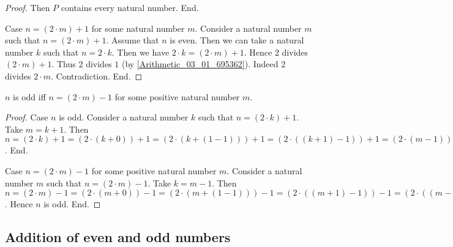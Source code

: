 \documentclass[../../arithmetic.tex]{subfiles}
\begin{document}
\begin{forthel}
\begin{proof}
        Then $P$ contains every natural number.
      End.

      Case $n = (2 \cdot m) + 1$ for some natural number $m$.
        Consider a natural number $m$ such that $n = (2 \cdot m) + 1$.
        Assume that $n$ is even.
        Then we can take a natural number $k$ such that $n = 2 \cdot k$.
        Then we have $2 \cdot k = (2 \cdot m) + 1$.
        Hence $2$ divides $(2 \cdot m) + 1$.
        Thus $2$ divides $1$ (by \ref{Arithmetic_03_01_695362}).
        Indeed $2$ divides $2 \cdot m$.
        Contradiction.
      End.
    \end{proof}

    \begin{proposition}\label{Arithmetic_03_07_164145}
      $n$ is odd iff $n = (2 \cdot m) - 1$ for some positive natural number $m$.
    \end{proposition}
    \begin{proof}
      Case $n$ is odd.
        Consider a natural number $k$ such that $n = (2 \cdot k) + 1$.
        Take $m = k + 1$.
        Then $n =
        (2 \cdot k) + 1 =
        (2 \cdot (k + 0)) + 1 =
        (2 \cdot (k + (1 - 1))) + 1 =
        (2 \cdot ((k + 1) - 1)) + 1 =
        (2 \cdot (m - 1)) + 1 =
        ((2 \cdot m) - (2 \cdot 1)) + 1 =
        ((2 \cdot m) - 2) + 1 =
        (2 \cdot m) - 1$.
      End.

      Case $n = (2 \cdot m) - 1$ for some positive natural number $m$.
        Consider a natural number $m$ such that $n = (2 \cdot m) - 1$.
        Take $k = m - 1$.
        Then $n =
        (2 \cdot m) - 1 =
        (2 \cdot (m + 0)) - 1 =
        (2 \cdot (m + (1 - 1))) - 1 =
        (2 \cdot ((m + 1) - 1)) - 1 =
        (2 \cdot ((m - 1) + 1)) - 1 =
        (2 \cdot (k + 1)) - 1 =
        ((2 \cdot k) + (2 \cdot 1)) - 1 =
        ((2 \cdot k) + 2) - 1 =
        (2 \cdot k) + (2 - 1) =
        (2 \cdot k) + 1$.
        Hence $n$ is odd.
      End.
    \end{proof}
  \end{forthel}


  \subsection{Addition of even and odd numbers}
\end{document}
